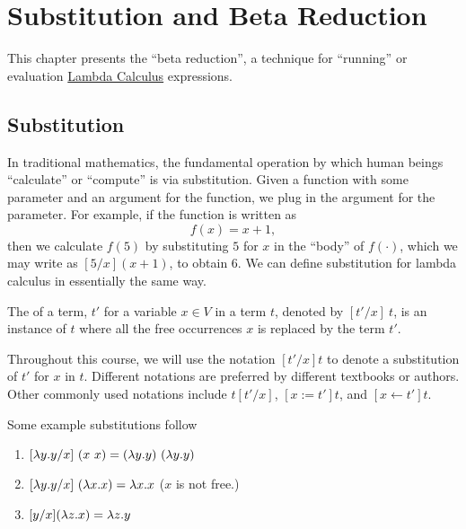 \chapter{Substitution and Beta Reduction}
\label{ch:lambda}

\begin{preamble}
This chapter presents the ``beta reduction'', a technique for ``running'' or evaluation \href{ch:lcs}{Lambda Calculus} expressions.
\end{preamble}

\section{Substitution}
\label{sec:lcsb::sub}

In traditional mathematics, the fundamental operation by which human beings ``calculate'' or ``compute'' is via substitution.
%
Given a function with some parameter and an argument for the function, we plug in the argument for the parameter.
%
For example, if the function is written as 
\[
f(x) = x + 1,
\]  
then we calculate $f(5)$ by substituting $5$ for $x$ in the ``body'' of $f(\cdot)$, which we may write as $[5/x](x+1)$, to obtain $6$.
%
We can define substitution for lambda calculus in essentially the same
way.

\begin{definition}[Substitution]
\label{def:lcsb::basic}
The  of a term, $t'$ for a variable $x \in V$ in a term
$t$, denoted by $[t'/x]~t$, is an instance of $t$ where all the free
occurrences $x$ is replaced by the term $t'$.
\end{definition}

Throughout this course, we will use the notation $[t'/x]t$ to denote a
substitution of $t'$ for $x$ in $t$.  Different notations are
preferred by different textbooks or authors. Other commonly used
notations include $t[t'/x]$, $[x:=t']t$, and  $[x \leftarrow t']t$.  

\begin{example}
\label{xmpl:lcsb::basic}
Some example substitutions follow
\begin{enumerate}
\item $[\lambda y.y/x]~(x~x)= (\lambda y.y)~(\lambda y.y)$

\item $[\lambda y.y/x]~(\lambda x.x) = \lambda x.x$ ($x$ is not free.)

\item $[y/x](\lambda z.x) = \lambda z.y$

\end{enumerate}
\end{example}

